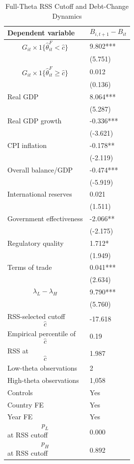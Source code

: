 \begin{table}[H]\centering
\begin{threeparttable}
\caption{Full-Theta RSS Cutoff and Debt-Change Dynamics}
\label{tab:deltaB_rss_cutoff_fulltheta}
\scriptsize
\begin{tabularx}{\textwidth}{lY}
\toprule
Dependent variable & $$B_{i,t+1}-B_{it}$$ \\
\midrule
$$G_{it}\times 1\{\widehat{\theta}^{F}_{it}<\widehat{c}\}$$ & 9.802*** \\
 & (5.751) \\
$$G_{it}\times 1\{\widehat{\theta}^{F}_{it}\geq\widehat{c}\}$$ & 0.012 \\
 & (0.136) \\
Real GDP & 8.064*** \\
 & (5.287) \\
Real GDP growth & -0.336*** \\
 & (-3.621) \\
CPI inflation & -0.178** \\
 & (-2.119) \\
Overall balance/GDP & -0.474*** \\
 & (-5.919) \\
International reserves & 0.021 \\
 & (1.511) \\
Government effectiveness & -2.066** \\
 & (-2.175) \\
Regulatory quality & 1.712* \\
 & (1.949) \\
Terms of trade & 0.041*** \\
 & (2.634) \\
$$\lambda_L-\lambda_H$$ & 9.790*** \\
 & (5.760) \\
\midrule
RSS-selected cutoff $$\widehat{c}$$ & -17.618 \\
Empirical percentile of $$\widehat{c}$$ & 0.19 \\
RSS at $$\widehat{c}$$ & 1.987 \\
Low-theta observations & 2 \\
High-theta observations & 1,058 \\
Controls & Yes \\
Country FE & Yes \\
Year FE & Yes \\
$$p_L$$ at RSS cutoff & 0.000 \\
$$p_H$$ at RSS cutoff & 0.892 \\

\end{tabularx}
\end{threeparttable}
\end{table}
